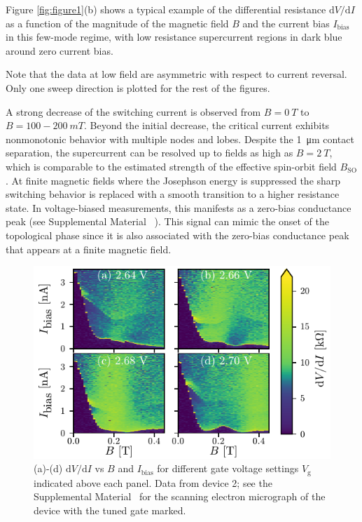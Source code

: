 Figure \ref{fig:figure1}(b) shows a typical example of the differential resistance $\mathrm{d}V/\mathrm{d}I$ as a function of the magnitude of the magnetic field $B$ and the current bias $I_\mathrm{bias}$ in this few-mode regime, with low resistance supercurrent regions in dark blue around zero current bias. 

Note that the data at low field are asymmetric with respect to current reversal. Only one sweep direction is plotted for the rest of the figures.

A strong decrease of the switching current is observed from $B=\SI{0}{T}$ to $B=100-\SI{200}{mT}$. 
Beyond the initial decrease, the critical current exhibits nonmonotonic behavior with multiple nodes and lobes. 
Despite the \SI{1}{\micro \meter} contact separation, the supercurrent can be resolved up to fields as high as $B=\SI{2}{T}$, which is comparable to the estimated strength of the effective spin-orbit field $B_\mathrm{SO}$.
At finite magnetic fields where the Josephson energy is suppressed the sharp switching behavior is replaced with a smooth transition to a higher resistance state. 
In voltage-biased measurements, this manifests as a zero-bias conductance peak (see Supplemental Material ~\cite{supp}). 
This signal can mimic the onset of the topological phase since it is also associated with the zero-bias conductance peak that appears at a finite magnetic field.

\begin{figure}[t]
\includegraphics[width=\columnwidth]{chapter_supercurrent/figures/fig2.pdf}
\caption{(a)-(d) $\mathrm{d}V/\mathrm{d}I$ vs $B$ and $I_\mathrm{bias}$ for different gate voltage settings $V_\mathrm{g}$ indicated above each panel.  Data from device 2; see the Supplemental Material~\cite{supp} for the scanning electron micrograph of the device with the tuned gate marked.}
\label{fig:figure2}
\end{figure}

